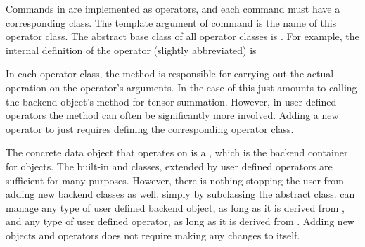 Commands in \Cengine{} are implemented as operators, and each command must have a 
corresponding class. The template argument of  
command is the name of this operator class. The abstract base class of all 
operator classes is .  
For example, the internal definition of the  operator 
(slightly abbreviated) is  

\mbox{} 

In each operator class, the  method is responsible for carrying out the actual operation on 
the operator's arguments. In the case of  this just amounts to 
calling the backend object's method for tensor summation. 
However, in user-defined operators the  method can often be significantly more involved. 
Adding a new operator to \Cengine{} just requires defining the corresponding operator class. 

The concrete data object that  operates on is a , 
which is the backend container for  objects. 
The built-in  and  classes, 
extended by user defined operators are sufficient for many purposes. 
However, there is nothing stopping the user from adding new backend classes as well, simply 
by subclassing the  abstract class. 
\Cengine{} can manage any type of user defined backend object, as long as it is derived from 
, and any type of user defined operator, as long as it is derived from 
. 
Adding new objects and operators does not require making any changes to \Cengine{} itself.  


